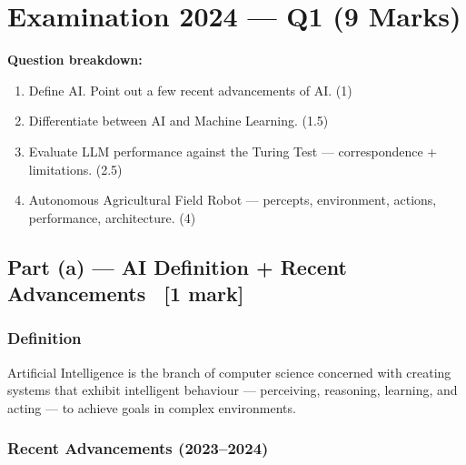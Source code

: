 \documentclass[12pt, a4paper]{article}
\newenvironment{solutionbox}{\begin{mdframed}[style=solutionframe]}{\end{mdframed}}
\begin{document}
\newpage

\section{Examination 2024 — Q1 (9 Marks)}

\begin{solutionbox}
\textbf{Question breakdown:}
\begin{enumerate}[noitemsep]
  \item[(a)] Define AI. Point out a few recent advancements of AI. (1)
  \item[(b)] Differentiate between AI and Machine Learning. (1.5)
  \item[(c)] Evaluate LLM performance against the Turing Test — correspondence + limitations. (2.5)
  \item[(d)] Autonomous Agricultural Field Robot — percepts, environment, actions, performance, architecture. (4)
\end{enumerate}
\end{solutionbox}

\subsection{Part (a) — AI Definition + Recent Advancements \ [1 mark]}

\subsubsection*{Definition}

\noindent Artificial Intelligence is the branch of computer science concerned with creating systems that exhibit intelligent behaviour — perceiving, reasoning, learning, and acting — to achieve goals in complex environments.

\subsubsection*{Recent Advancements (2023–2024)}
\end{document}
